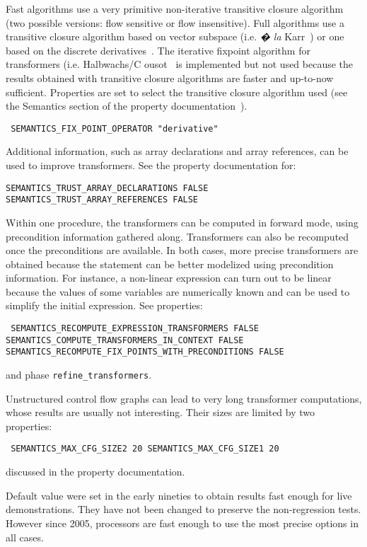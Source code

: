 \documentclass[a4paper]{report}
\begin{document}
Fast algorithms use a very primitive non-iterative transitive closure
algorithm (two possible versions: flow sensitive or flow insensitive).
Full algorithms use a transitive closure algorithm based on vector
subspace (i.e. \emph{� la} K{\sc arr}~\cite{Karr76}) or one based on
the discrete derivatives~\cite{Irigoin2006}. The iterative fixpoint
algorithm for transformers (i.e. H{\sc albwachs}/C{\sc
ousot}~\cite{HC78} is implemented but not used because the results
obtained with transitive closure algorithms are faster and up-to-now
sufficient. Properties
are set to select the transitive closure algorithm used (see the
Semantics section of the property documentation~\cite{}).

\texttt{
SEMANTICS\_FIX\_POINT\_OPERATOR "derivative"
}

Additional information, such as array declarations and array
references, can be used to improve transformers. See the property
documentation for:

\texttt{SEMANTICS\_TRUST\_ARRAY\_DECLARATIONS FALSE}
\texttt{SEMANTICS\_TRUST\_ARRAY\_REFERENCES FALSE}

Within one procedure, the transformers can be computed in forward
mode, using precondition information gathered along. Transformers can
also be recomputed once the preconditions are available. In both
cases, more precise transformers are obtained because the statement
can be better modelized using precondition information. For instance,
a non-linear expression can turn out to be linear because the values
of some variables are numerically known and can be used to simplify
the initial expression. See properties:

\texttt{
SEMANTICS\_RECOMPUTE\_EXPRESSION\_TRANSFORMERS FALSE
SEMANTICS\_COMPUTE\_TRANSFORMERS\_IN\_CONTEXT FALSE
SEMANTICS\_RECOMPUTE\_FIX\_POINTS\_WITH\_PRECONDITIONS FALSE
}

and phase \verb/refine_transformers/.

Unstructured control flow graphs can lead to very long transformer computations, whose results are usually not interesting. Their sizes are limited by two properties:

\texttt{
SEMANTICS\_MAX\_CFG\_SIZE2 20
SEMANTICS\_MAX\_CFG\_SIZE1 20
}

discussed in the property documentation.

Default value were set in the early nineties to obtain results fast
enough for live demonstrations. They have not been changed to preserve the
non-regression tests. However since 2005, processors are fast enough to use
the most precise options in all cases.
\end{document}
